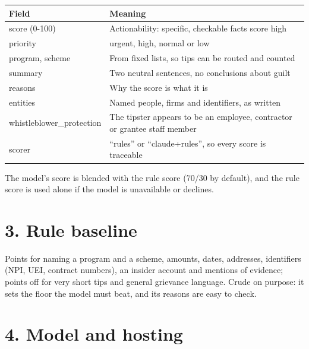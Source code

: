 \documentclass[letterpaper,11pt]{article}
\begin{document}
\begingroup\small\setlength{\tabcolsep}{4pt}\renewcommand{\arraystretch}{1.25}
\begin{longtable}[l]{@{}>{\raggedright\arraybackslash}p{}>{\raggedright\arraybackslash}p{}@{}}
\rowcolor{coolblack}\leavevmode\color{white}\bfseries Field & \leavevmode\color{white}\bfseries Meaning \\
\endhead
score (0-100) & Actionability: specific, checkable facts score high \\
priority & urgent, high, normal or low \\
program, scheme & From fixed lists, so tips can be routed and counted \\
summary & Two neutral sentences, no conclusions about guilt \\
reasons & Why the score is what it is \\
entities & Named people, firms and identifiers, as written \\
whistleblower\_protection & The tipster appears to be an employee, contractor or grantee staff member \\
scorer & ``rules'' or ``claude+rules'', so every score is traceable \\
\end{longtable}\endgroup

The model's score is blended with the rule score (70/30 by default), and
the rule score is used alone if the model is unavailable or declines.

\hypertarget{rule-baseline}{%
\section*{3. Rule baseline}\label{rule-baseline}}

Points for naming a program and a scheme, amounts, dates, addresses,
identifiers (NPI, UEI, contract numbers), an insider account and
mentions of evidence; points off for very short tips and general
grievance language. Crude on purpose: it sets the floor the model must
beat, and its reasons are easy to check.

\hypertarget{model-and-hosting}{%
\section*{4. Model and hosting}\label{model-and-hosting}}
\end{document}
